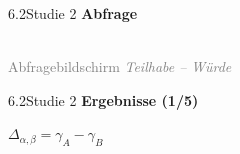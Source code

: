 \documentclass[xcolor=table,9pt,aspectratio=169]{beamer}
\begin{document}
\begin{frame}{\vspace*{10mm}6.2\hspace*{1em}Studie 2}
\textbf{Abfrage}\\
\medskip
\begin{center}
   \\
   \textcolor{gray}{Abfragebildschirm \textit{Teilhabe -- Würde}}
\end{center}
\end{frame}


\begin{frame}{\vspace*{10mm}6.2\hspace*{1em}Studie 2}
\textbf{Ergebnisse (1/5)}\\
\medskip
\begin{center}
   $\Delta_{\alpha,\beta}=\gamma_{A}-\gamma_{B}$
\end{center}
\end{frame}
\end{document}

